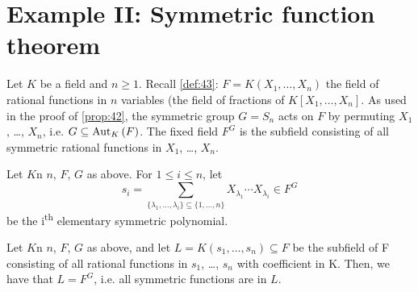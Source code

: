
\section{Example II: Symmetric function theorem}

Let $K$ be a field and $n \geq 1$. Recall \autoref{def:43}: $F = K(X_1, \ldots, X_n)$ the field of rational functions in $n$ variables (the field of fractions of $K[X_1, \ldots, X_n]$. As used in the proof of \autoref{prop:42}, the symmetric group $G = S_n$ acts on $F$ by permuting $X_1$, \ldots, $X_n$, i.e. $G \subseteq \autset[K]{F}$. The fixed field $F^G$ is the subfield consisting of all symmetric rational functions in $X_1$, \ldots, $X_n$.

\begin{definition}
  Let $K$n $n$, $F$, $G$ as above. For $1 \leq i \leq n$, let
\[
s_i = \sum_{\{\lambda_1, \ldots, \lambda_i\} \subseteq \{1, \ldots, n \}} X_{\lambda_1}\cdots{}X_{\lambda_i} \in F^G
\]
be the i\textsuperscript{th} elementary symmetric polynomial.
\end{definition}

\begin{proposition}
   Let $K$n $n$, $F$, $G$ as above, and let $L = K(s_1, \ldots, s_n) \subseteq F$ be the subfield of F consisting of all rational functions in $s_1$, \ldots, $s_n$ with coefficient in K. Then, we have that $L = F^G$, i.e. all symmetric functions are in $L$.
\end{proposition}

